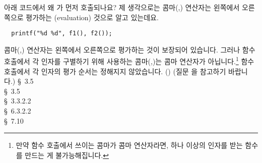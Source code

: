\begin{faq}
        아래 코드에서 왜 가 먼저 호출되나요? 제 생각으로는 콤마(,) 연산자는
        왼쪽에서 오른쪽으로 평가하는 (evaluation) 것으로 알고 있는데요.
\begin{verbatim}
  printf("%d %d", f1(), f2());        
\end{verbatim}
\A
        콤마(,) 연산자는 왼쪽에서 오른쪽으로 평가하는 것이 보장되어 있습니다. 그러나
        함수 호출에서 각 인자를 구별하기 위해 사용하는 콤마(,)는 콤마 연산자가
        아닙니다.\footnote{만약 함수 호출에서 쓰이는 콤마가 콤마 연산자라면,
        하나 이상의 인자를 받는 함수를 만드는 게 불가능해집니다.}
        함수 호출에서 각 인자의 평가 순서는 정해지지 않았습니다. ()
        (질문 을 참고하기 바랍니다.)
\R
        \cite{kr1} \S\ 3.5  \\
        \cite{kr2} \S\ 3.5  \\
        \cite{ansi} \S\ 3.3.2.2 \\
        \cite{c89} \S\ 6.3.2.2 \\
        \cite{hs} \S\ 7.10 
\end{faq}

